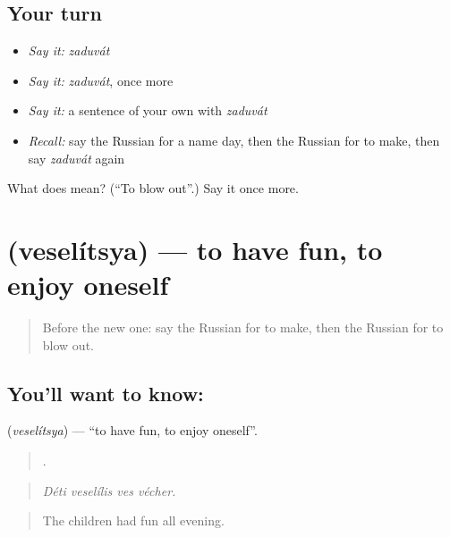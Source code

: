 \subsection*{Your turn}
\begin{itemize}
\raggedright
  \item \emph{Say it:} \emph{zaduvát}
  \item \emph{Say it:} \emph{zaduvát}, once more
  \item \emph{Say it:} a sentence of your own with \emph{zaduvát}
  \item \emph{Recall:} say the Russian for a name day, then the Russian for to make, then say \emph{zaduvát} again
\end{itemize}

\begin{tcolorbox}[breakable,colback=teal!4,colframe=teal!35!black,title={Before you move on}]
What does  mean? (\textquotedblleft{}To blow out\textquotedblright{}.) Say it once more.
\end{tcolorbox}
\section[\texorpdfstring{\ru{веселиться} (veselítsya)}{веселиться (veselítsya)}]{ (veselítsya) — to have fun, to enjoy oneself}

\label{lesson:RU-C317-veselitsya}



\begin{quote}
Before the new one: say the Russian for to make, then the Russian for to blow out.
\end{quote}

\subsection*{You'll want to know: }
\textbf{} (\emph{veselítsya}) — \textquotedblleft{}to have fun, to enjoy oneself\textquotedblright{}.

\begin{quote}
   .
\end{quote}

\begin{quote}
\emph{Déti veselílis ves vécher.}
\end{quote}

\begin{quote}
The children had fun all evening.
\end{quote}

